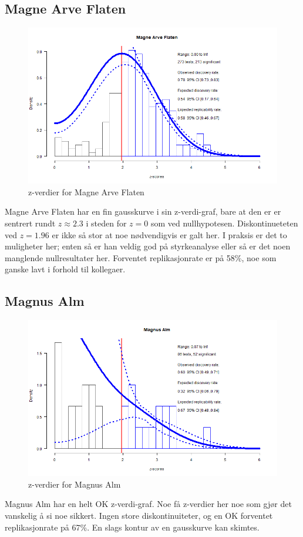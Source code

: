 \documentclass[doc,norsk]{apa7}
\begin{document}
\subsection{Magne Arve Flaten}
\begin{figure}[h!]
    \centering
    \includegraphics[width=\textwidth]{images/Magne Arve Flaten.png}
    \caption{z-verdier for Magne Arve Flaten}
\end{figure}
Magne Arve Flaten har en fin gausskurve i sin z-verdi-graf, bare at den er er sentrert rundt $z \approx 2.3$ i steden for $z = 0$ som ved nullhypotesen. Diskontinueteten ved $z = 1.96$ er ikke så stor at noe nødvendigvis er galt her. I praksis er det to muligheter her; enten så er han veldig god på styrkeanalyse eller så er det noen manglende nullresultater her. Forventet replikasjonrate er på 58\%, noe som ganske lavt i forhold til kollegaer.

\subsection{Magnus Alm}
\begin{figure}[h!]
    \centering
    \includegraphics[width=\textwidth]{images/Magnus Alm.png}
    \caption{z-verdier for Magnus Alm}
\end{figure}
Magnus Alm har en helt OK z-verdi-graf. Noe få z-verdier her noe som gjør det vanskelig å si noe sikkert. Ingen store diskontinuiteter, og en OK forventet replikasjonrate på 67\%. En slags kontur av en gausskurve kan skimtes.
\end{document}
